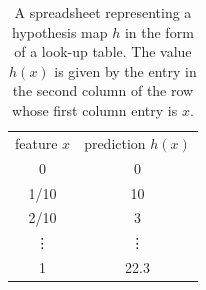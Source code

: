 \documentclass[12pt]{report}
\begin{document}
\vspace*{2mm}
\begin{table}
\begin{center}
\begin{tabular}{ |c|c| }
  \multicolumn{1}{c}{feature $x$}
  &  \multicolumn{1}{c}{prediction $h(x)$} \\
\cline{1-2}
 0 & 0 \\
 \cline{1-2}
 1/10 & 10 \\
 \cline{1-2}
 2/10 & 3 \\
 \cline{1-2}
 \vdots & \vdots \\
 \cline{1-2}
 1 & 22.3 \\
\cline{1-2}
\end{tabular}
\end{center}
\caption{A spreadsheet representing a hypothesis map $h$ 
	in the form of a look-up table. The value $h(x)$ is given
	by the entry in the second column of the row whose first 
	column entry is $x$.}
\label{table_lookup}
\end{table}
\vspace*{2mm}

\end{document}
